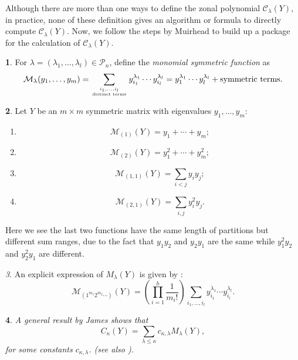\documentclass[10pt,oneside,american]{amsart}
\numberwithin{equation}{section}
\numberwithin{figure}{section}
\theoremstyle{plain}
\newtheorem{thm}{\protect\theoremname}[section]
\theoremstyle{definition}
\newtheorem{defn}[thm]{\protect\definitionname}
\theoremstyle{remark}
\newtheorem{rem}[thm]{\protect\remarkname}
\theoremstyle{plain}
\theoremstyle{definition}
\newtheorem{example}[thm]{\protect\examplename}
\theoremstyle{plain}
\theoremstyle{plain}
\providecommand{\definitionname}{Definition}
\providecommand{\examplename}{Example}
\providecommand{\remarkname}{Remark}
\providecommand{\theoremname}{Theorem}
\begin{document}
Although there are more than one ways to define the zonal polynomial $\mathcal{C}_{\lambda}(Y)$,
in practice, none of these definition gives an algorithm or formula
to directly compute $\mathcal{C}_{\lambda}(Y)$. Now, we
follow the steps by Muirhead \cite{Muirhead} to build up a package for the
calculation of $\mathcal{C}_{\lambda}(Y)$.
\begin{defn}
For $\lambda=\left(\lambda_{1},\ldots,\lambda_{l}\right)\in\mathcal{P}_{n}$,
define the \emph{monomial symmetric function} as 
\begin{equation}
\mathcal{M}_{\lambda}(y_{1},\ldots,y_{m})=\sum_{\genfrac{}{}{0pt}{}{i_{1},\ldots,i_{l}}{\text{distinct terms}}}y_{i_{1}}^{\lambda_{1}}\cdots y_{i_{l}}^{\lambda_{l}}=y_{1}^{\lambda_{1}}\cdots y_{l}^{\lambda_{l}}+\text{symmetric terms}.\label{eq:MZonal}
\end{equation}
\end{defn}
\begin{example}
Let $Y$ be an $m\times m$ symmetric matrix with eigenvalues $y_{1},\ldots,y_{m}$:
\begin{enumerate}
\item 
\[
\mathcal{M}_{\left(1\right)}(Y)=y_{1}+\cdots+y_{m};
\]
\item 
\[
\mathcal{M}_{\left(2\right)}(Y)=y_{1}^{2}+\cdots+y_{m}^{2};
\]
\item \label{enu:ILessThanJ}
\[
\mathcal{M}_{\left(1,1\right)}(Y)=\underset{i<j}{\sum}y_{i}y_{j};
\]
\item \label{enu:IANDJ}
\[
\mathcal{M}_{\left(2,1\right)}(Y)=\underset{i,j}{\sum}y_{i}^{2}y_{j}.
\]
\end{enumerate}
Here we see the last two functions have the same length of partitions
but different sum ranges, due to the fact that $y_{1}y_{2}$ and $y_{2}y_{1}$
are the same while $y_{1}^{2}y_{2}$ and $y_{2}^{2}y_{1}$ are different. 
\end{example}
\begin{rem}
An explicit expression of $M_{\lambda}(Y)$ is given by
\cite[pp.~11, eq.~6]{Takemura}:
\begin{equation}
\mathcal{M}_{\left(1^{m_{1}}2^{m_{2}}\cdots\right)}\left(Y\right)=\left(\prod_{i=1}^{h}\frac{1}{m_{i}!}\right)\sum_{i_{1},\ldots,i_{l}}y_{i_{1}}^{\lambda_{1}}\cdots y_{i_{l}}^{\lambda_{l}}.\label{eq:MZonalComputation}
\end{equation}
\end{rem}
\begin{thm}
A general result by James \cite{James1} shows that
\begin{equation}
C_{\kappa}(Y)=\sum_{\lambda\leq\kappa}c_{\kappa,\lambda}M_{\lambda}(Y),\label{eq:CInTermsOfM}
\end{equation}
 for some constants $c_{\kappa,\lambda}$. (see also \cite[pp.~234, eq.~13]{Muirhead}).
\end{thm}
\end{document}
